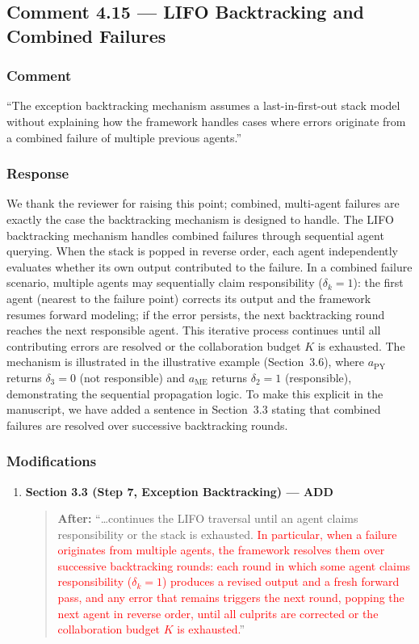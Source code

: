 \documentclass[11pt,a4paper]{article}
\begin{document}
\subsection{Comment 4.15 --- LIFO Backtracking and Combined Failures}

\subsubsection{Comment}
``The exception backtracking mechanism assumes a last-in-first-out stack model without explaining how the framework handles cases where errors originate from a combined failure of multiple previous agents.''

\subsubsection{Response}
We thank the reviewer for raising this point; combined, multi-agent failures are exactly the case the backtracking mechanism is designed to handle. The LIFO backtracking mechanism handles combined failures through sequential agent querying. When the stack is popped in reverse order, each agent independently evaluates whether its own output contributed to the failure. In a combined failure scenario, multiple agents may sequentially claim responsibility ($\delta_k=1$): the first agent (nearest to the failure point) corrects its output and the framework resumes forward modeling; if the error persists, the next backtracking round reaches the next responsible agent. This iterative process continues until all contributing errors are resolved or the collaboration budget $K$ is exhausted. The mechanism is illustrated in the illustrative example (Section~3.6), where $a_{\text{PY}}$ returns $\delta_3=0$ (not responsible) and $a_{\text{ME}}$ returns $\delta_2=1$ (responsible), demonstrating the sequential propagation logic. To make this explicit in the manuscript, we have added a sentence in Section~3.3 stating that combined failures are resolved over successive backtracking rounds.

\subsubsection{Modifications}
\begin{enumerate}
\item \textbf{Section 3.3 (Step 7, Exception Backtracking) --- ADD}
\begin{quote}
\textbf{After:} ``\ldots continues the LIFO traversal until an agent claims responsibility or the stack is exhausted. \textcolor{red}{In particular, when a failure originates from multiple agents, the framework resolves them over successive backtracking rounds: each round in which some agent claims responsibility ($\delta_k=1$) produces a revised output and a fresh forward pass, and any error that remains triggers the next round, popping the next agent in reverse order, until all culprits are corrected or the collaboration budget $K$ is exhausted.}''
\end{quote}
\end{enumerate}
\end{document}

